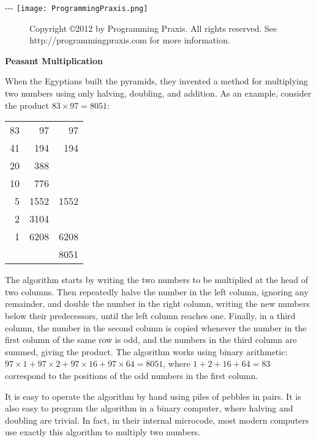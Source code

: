 \documentclass{article}
\begin{document}
 \begin{small}

\null \kern -\headheight \kern -\headsep \kern -\topskip \noindent
  \texttt{[image: ProgrammingPraxis.png]}

\begin{figure}[b]\begin{minipage}{\textwidth}\tiny
Copyright \copyright 2012 by Programming Praxis.
All rights reserved.
See http://programmingpraxis.com for more information.
\end{minipage}\end{figure}

\begin{center}
\textbf{Peasant Multiplication}
\end{center}

When the Egyptians built the pyramids, they in­vented a method for multiplying two numbers using only halving, doubling, and addition. As an example, consider the product $83 \times 97 = 8051$:

\begin{center}
\begin{tabular}{rrr}
83 &   97 &   97 \\
41 &  194 &  194 \\
20 &  388        \\
10 &  776        \\
 5 & 1552 & 1552 \\
 2 & 3104        \\
 1 & 6208 & 6208 \\ \cline{3-3}
   &      & 8051
\end{tabular}
\end{center}

The algorithm starts by writing the two numbers to be multiplied at the head of two columns. Then repeatedly halve the number in the left col­umn, ignoring any remainder, and double the number in the right column, writing the new numbers below their predecessors, until the left column reaches one. Finally, in a third column, the number in the second column is copied whenever the number in the first column of the same row is odd, and the numbers in the third column are summed, giving the product. The algorithm works using binary arithmetic: $97 \times 1 + 97 \times 2 + 97 \times 16 + 97 \times 64 = 8051$, where $1 + 2 + 16 + 64 = 83$ correspond to the positions of the odd numbers in the first column.

It is easy to operate the algorithm by hand using piles of pebbles in pairs. It is also easy to pro­gram the algorithm in a binary computer, where halving and doubling are trivial. In fact, in their internal microcode, most modern computers use exactly this algorithm to multiply two numbers.


\end{small}
\end{document}
